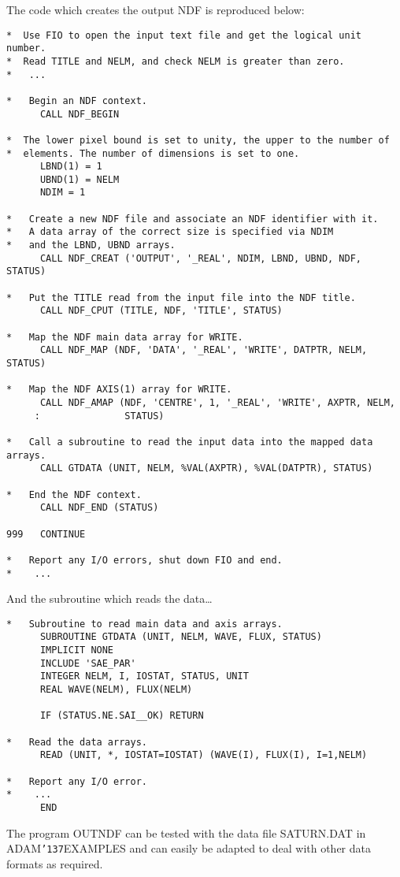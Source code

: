 \documentclass[twoside,11pt]{article}
\renewcommand{\_}{{\tt\char'137}}
\begin{document}
The code which creates the output NDF is reproduced below:
\begin{verbatim}
*  Use FIO to open the input text file and get the logical unit number.
*  Read TITLE and NELM, and check NELM is greater than zero.
*   ...

*   Begin an NDF context.
      CALL NDF_BEGIN

*  The lower pixel bound is set to unity, the upper to the number of
*  elements. The number of dimensions is set to one.
      LBND(1) = 1
      UBND(1) = NELM
      NDIM = 1

*   Create a new NDF file and associate an NDF identifier with it.
*   A data array of the correct size is specified via NDIM
*   and the LBND, UBND arrays.
      CALL NDF_CREAT ('OUTPUT', '_REAL', NDIM, LBND, UBND, NDF, STATUS)

*   Put the TITLE read from the input file into the NDF title.
      CALL NDF_CPUT (TITLE, NDF, 'TITLE', STATUS)

*   Map the NDF main data array for WRITE.
      CALL NDF_MAP (NDF, 'DATA', '_REAL', 'WRITE', DATPTR, NELM, STATUS)

*   Map the NDF AXIS(1) array for WRITE.
      CALL NDF_AMAP (NDF, 'CENTRE', 1, '_REAL', 'WRITE', AXPTR, NELM,
     :               STATUS)

*   Call a subroutine to read the input data into the mapped data arrays.
      CALL GTDATA (UNIT, NELM, %VAL(AXPTR), %VAL(DATPTR), STATUS)

*   End the NDF context.
      CALL NDF_END (STATUS)

999   CONTINUE

*   Report any I/O errors, shut down FIO and end.
*    ...
\end{verbatim}
And the subroutine which reads the data\ldots
\begin{verbatim}
*   Subroutine to read main data and axis arrays.
      SUBROUTINE GTDATA (UNIT, NELM, WAVE, FLUX, STATUS)
      IMPLICIT NONE
      INCLUDE 'SAE_PAR'
      INTEGER NELM, I, IOSTAT, STATUS, UNIT
      REAL WAVE(NELM), FLUX(NELM)

      IF (STATUS.NE.SAI__OK) RETURN

*   Read the data arrays.
      READ (UNIT, *, IOSTAT=IOSTAT) (WAVE(I), FLUX(I), I=1,NELM)

*   Report any I/O error.
*    ...
      END
\end{verbatim}
The program OUTNDF can be tested with the data file SATURN.DAT in
ADAM\_EXAMPLES and can easily be adapted to deal with other data formats
as required.
\end{document}
